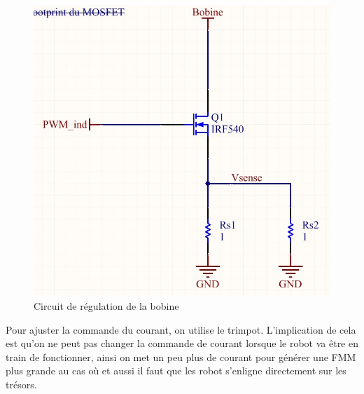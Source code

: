   \begin{figure}[H]
    \label{drive}
    \centering
    \includegraphics[scale=0.3]{resources/drivemosfet.jpg}
    \caption{Circuit de régulation de la bobine}
  \end{figure}


Pour ajuster la commande du courant, on utilise le trimpot. L'implication de cela est qu'on ne peut pas changer la commande de courant lorsque le robot va être en train de fonctionner, ainsi on met un peu plus de courant pour générer une FMM plus grande au cas où et aussi il faut que les robot s'enligne directement sur les trésors.